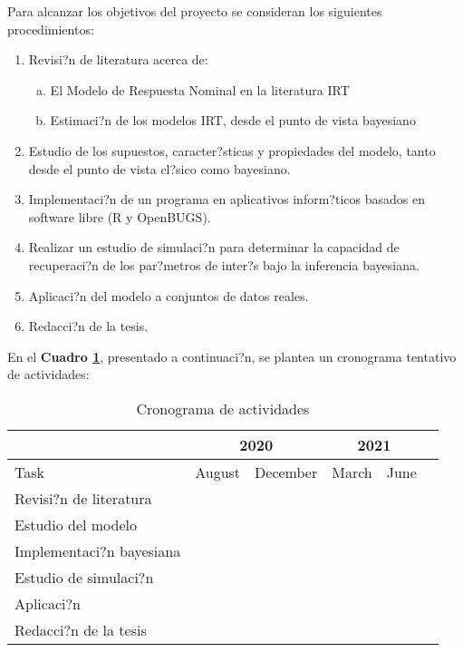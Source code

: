 Para alcanzar los objetivos del proyecto se consideran los siguientes procedimientos:
\begin{enumerate}
	\item Revisi?n de literatura acerca de:
	\begin{enumerate}[(a)]
		\item El Modelo de Respuesta Nominal en la literatura IRT
 		\item Estimaci?n de los modelos IRT, desde el punto de vista bayesiano
	\end{enumerate}

	\item Estudio de los supuestos, caracter?sticas y propiedades del modelo, tanto desde el punto de vista cl?sico como bayesiano.
	\item Implementaci?n de un programa en aplicativos inform?ticos basados en software libre (R y OpenBUGS).
	\item Realizar un estudio de simulaci?n para determinar la capacidad de recuperaci?n de los par?metros de inter?s bajo la inferencia bayesiana.
	\item Aplicaci?n del modelo a conjuntos de datos reales.
	\item Redacci?n de la tesis.
\end{enumerate}

En el \textbf{Cuadro \ref{tabla1}}, presentado a continuaci?n, se plantea un cronograma tentativo de actividades:

\newcommand{\X}{\textbullet} 			%

\begin{table}[h]
  \centering
  \begin{tabular}{|l||c|c|c|c|c|}
    \hline
                            & \multicolumn{2}{|c|}{2020}  & \multicolumn{2}{|c|}{2021} \\
    \hline
    \hline
    Task                    & August  & December          & March   & June  \\
    \hline
    Revisi?n de literatura  & \X      & \X                & \X      & \X  	\\
    Estudio del modelo      & \X      & \X                & \X      & \X  	\\    
    Implementaci?n bayesiana& \X      & \X                & \X      & \X  	\\
    Estudio de simulaci?n   & \X      & \X                & \X      & \X  	\\
    Aplicaci?n              & \X      & \X                & \X      & \X  	\\
    Redacci?n de la tesis   & \X      & \X                & \X      & \X  	\\
    \hline
    \hline
  \end{tabular}
  \caption{Cronograma de actividades}
  \label{tabla1}
\end{table}